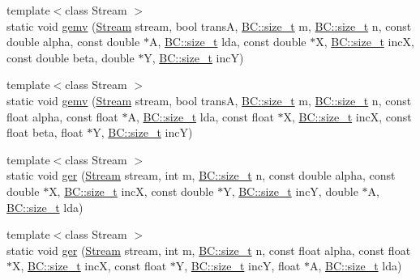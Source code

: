 \begin{DoxyCompactItemize}
\item 
{\footnotesize template$<$class Stream $>$ }\\static void \hyperlink{structBC_1_1blas_1_1BLAS_3_01host__tag_01_4_ad3bc9f3b32b2b3d197b39b98a7244818}{gemv} (\hyperlink{namespaceBC_abc64a63cd29a22d102a68f478dfd588d}{Stream} stream, bool transA, \hyperlink{namespaceBC_a6007cbc4eeec401a037b558910a56173}{B\+C\+::size\+\_\+t} m, \hyperlink{namespaceBC_a6007cbc4eeec401a037b558910a56173}{B\+C\+::size\+\_\+t} n, const double alpha, const double $\ast$A, \hyperlink{namespaceBC_a6007cbc4eeec401a037b558910a56173}{B\+C\+::size\+\_\+t} lda, const double $\ast$X, \hyperlink{namespaceBC_a6007cbc4eeec401a037b558910a56173}{B\+C\+::size\+\_\+t} incX, const double beta, double $\ast$Y, \hyperlink{namespaceBC_a6007cbc4eeec401a037b558910a56173}{B\+C\+::size\+\_\+t} incY)
\item 
{\footnotesize template$<$class Stream $>$ }\\static void \hyperlink{structBC_1_1blas_1_1BLAS_3_01host__tag_01_4_abff02539f7824d8a3da452a105c8afc5}{gemv} (\hyperlink{namespaceBC_abc64a63cd29a22d102a68f478dfd588d}{Stream} stream, bool transA, \hyperlink{namespaceBC_a6007cbc4eeec401a037b558910a56173}{B\+C\+::size\+\_\+t} m, \hyperlink{namespaceBC_a6007cbc4eeec401a037b558910a56173}{B\+C\+::size\+\_\+t} n, const float alpha, const float $\ast$A, \hyperlink{namespaceBC_a6007cbc4eeec401a037b558910a56173}{B\+C\+::size\+\_\+t} lda, const float $\ast$X, \hyperlink{namespaceBC_a6007cbc4eeec401a037b558910a56173}{B\+C\+::size\+\_\+t} incX, const float beta, float $\ast$Y, \hyperlink{namespaceBC_a6007cbc4eeec401a037b558910a56173}{B\+C\+::size\+\_\+t} incY)
\item 
{\footnotesize template$<$class Stream $>$ }\\static void \hyperlink{structBC_1_1blas_1_1BLAS_3_01host__tag_01_4_a275f5d4c788a496b1af0a2aa02a9dc80}{ger} (\hyperlink{namespaceBC_abc64a63cd29a22d102a68f478dfd588d}{Stream} stream, int m, \hyperlink{namespaceBC_a6007cbc4eeec401a037b558910a56173}{B\+C\+::size\+\_\+t} n, const double alpha, const double $\ast$X, \hyperlink{namespaceBC_a6007cbc4eeec401a037b558910a56173}{B\+C\+::size\+\_\+t} incX, const double $\ast$Y, \hyperlink{namespaceBC_a6007cbc4eeec401a037b558910a56173}{B\+C\+::size\+\_\+t} incY, double $\ast$A, \hyperlink{namespaceBC_a6007cbc4eeec401a037b558910a56173}{B\+C\+::size\+\_\+t} lda)
\item 
{\footnotesize template$<$class Stream $>$ }\\static void \hyperlink{structBC_1_1blas_1_1BLAS_3_01host__tag_01_4_aabb36e44446fd342a80ccbd9cbd783a1}{ger} (\hyperlink{namespaceBC_abc64a63cd29a22d102a68f478dfd588d}{Stream} stream, int m, \hyperlink{namespaceBC_a6007cbc4eeec401a037b558910a56173}{B\+C\+::size\+\_\+t} n, const float alpha, const float $\ast$X, \hyperlink{namespaceBC_a6007cbc4eeec401a037b558910a56173}{B\+C\+::size\+\_\+t} incX, const float $\ast$Y, \hyperlink{namespaceBC_a6007cbc4eeec401a037b558910a56173}{B\+C\+::size\+\_\+t} incY, float $\ast$A, \hyperlink{namespaceBC_a6007cbc4eeec401a037b558910a56173}{B\+C\+::size\+\_\+t} lda)

\end{DoxyCompactItemize}
